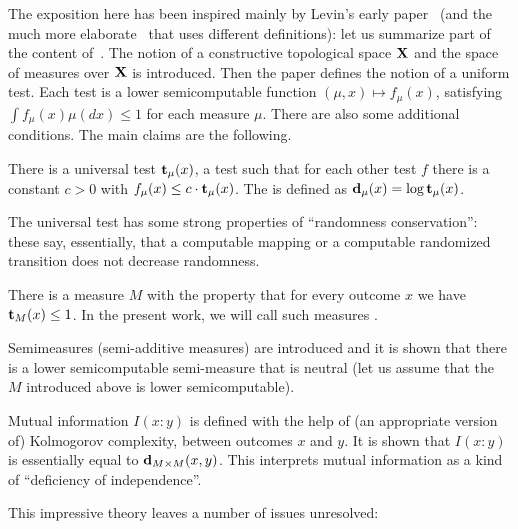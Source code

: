 The exposition here has been inspired mainly by Levin's early 
paper~\cite{LevinUnif76} (and the much more elaborate~\cite{LevinRandCons84}
that uses different definitions): let us summarize part of the content
of~\cite{LevinUnif76}.
The notion of a constructive topological space \( \mathbf{X} \) and the space of
measures over \( \mathbf{X} \) is introduced.
Then the paper defines the notion of a uniform test.
Each test is a lower semicomputable function \( (\mu,x) \mapsto f_{\mu}(x) \),
satisfying \( \int f_{\mu}(x) \mu(dx) \le 1 \) for each measure \( \mu \).
There are also some additional conditions.
The main claims are the following.
 \begin{alphenum}

  \item There is a universal test \( \mathbf{t}_{\mu}(x) \), a test 
such that for each other test \( f \) there is a constant \( c > 0 \) with
\( f_{\mu}(x) \le c\cdot \mathbf{t}_{\mu}(x) \).
  The  is defined as 
\( \mathbf{d}_{\mu}(x) = \log\mathbf{t}_{\mu}(x) \). 

  \item The universal test has some strong properties of ``randomness
conservation'': these say, essentially,
that a computable mapping or a computable
randomized transition does not decrease randomness.

  \item There is a measure \( M \) with the property that for
every outcome \( x \) we have \( \mathbf{t}_{M}(x) \le 1 \).
In the present work, we will call such measures .

  \item\label{i:Levin.semimeasure}
Semimeasures (semi-additive measures)
are introduced and it is shown that there is a lower semicomputable
semi-measure that is neutral (let us assume that the \( M \) introduced above
is lower semicomputable).

  \item Mutual information \( I(x : y) \)
is defined with the help of (an appropriate
version of) Kolmogorov complexity, between outcomes \( x \) and \( y \).
It is shown that \( I(x : y) \) is essentially equal to \( \mathbf{d}_{M \times M}(x,y) \).
This interprets mutual information as a kind of ``deficiency of independence''.

 \end{alphenum}
This impressive theory leaves a number of issues unresolved:
